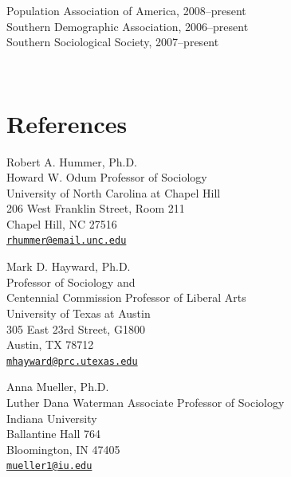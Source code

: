 \documentclass[11pt,]{article}
\begin{document}
\setlength{\leftskip}{0cm}

Population Association of America, 2008--present\\
Southern Demographic Association, 2006--present\\
Southern Sociological Society, 2007--present

~

\section{References}\label{references}

Robert A. Hummer, Ph.D.\\
Howard W. Odum Professor of Sociology\\
University of North Carolina at Chapel Hill\\
206 West Franklin Street, Room 211\\
Chapel Hill, NC 27516\\
\href{mailto:rhummer@email.unc.edu}{\nolinkurl{rhummer@email.unc.edu}}

Mark D. Hayward, Ph.D.\\
Professor of Sociology and\\
Centennial Commission Professor of Liberal Arts\\
University of Texas at Austin\\
305 East 23rd Street, G1800\\
Austin, TX 78712\\
\href{mailto:mhayward@prc.utexas.edu}{\nolinkurl{mhayward@prc.utexas.edu}}

Anna Mueller, Ph.D.\\
Luther Dana Waterman Associate Professor of Sociology\\
Indiana University\\
Ballantine Hall 764\\
Bloomington, IN 47405\\
\href{mailto:mueller1@iu.edu}{\nolinkurl{mueller1@iu.edu}}
\end{document}
